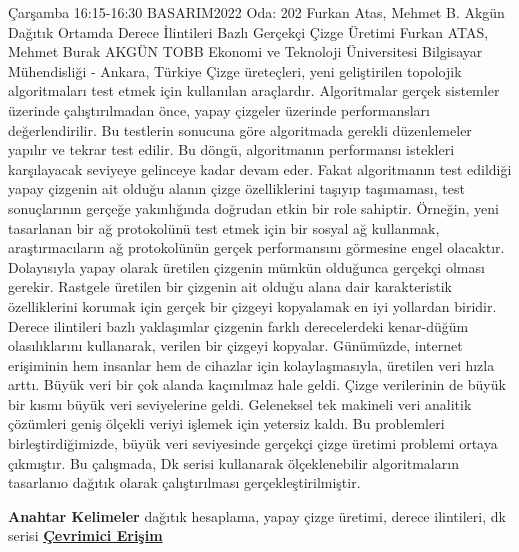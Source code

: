 
    \begin{abstract_basarim}
    {Çarşamba 16:15-16:30}
    {BASARIM2022}
    {Oda: 202}
    {Furkan Atas, Mehmet B. Akgün}
    {Dağıtık Ortamda Derece İlintileri Bazlı Gerçekçi Çizge Üretimi}
    {%
    Furkan ATAS, Mehmet Burak AKGÜN}
    {%
    }
    {%
    TOBB Ekonomi ve Teknoloji Üniversitesi Bilgisayar Mühendisliği - Ankara, Türkiye}
    Çizge üreteçleri, yeni geliştirilen topolojik algoritmaları test etmek için kullanılan araçlardır. Algoritmalar gerçek sistemler üzerinde çalıştırılmadan önce, yapay çizgeler üzerinde performansları değerlendirilir. Bu testlerin sonucuna göre algoritmada gerekli düzenlemeler yapılır ve tekrar test edilir. Bu döngü, algoritmanın performansı istekleri karşılayacak seviyeye gelinceye kadar devam eder. Fakat algoritmanın test edildiği yapay çizgenin ait olduğu alanın çizge özelliklerini taşıyıp taşımaması, test sonuçlarının gerçeğe yakınlığında doğrudan etkin bir role sahiptir. Örneğin, yeni tasarlanan bir ağ protokolünü test etmek için bir sosyal ağ kullanmak, araştırmacıların ağ protokolünün gerçek performansını görmesine engel olacaktır. Dolayısıyla yapay olarak üretilen çizgenin mümkün olduğunca gerçekçi olması gerekir. Rastgele üretilen bir çizgenin ait olduğu alana dair karakteristik özelliklerini korumak için gerçek bir çizgeyi kopyalamak en iyi yollardan biridir. Derece ilintileri bazlı yaklaşımlar çizgenin farklı derecelerdeki kenar-düğüm olasılıklarını kullanarak, verilen bir çizgeyi kopyalar. Günümüzde, internet erişiminin hem insanlar hem de cihazlar için kolaylaşmasıyla, üretilen veri hızla arttı. Büyük veri bir çok alanda kaçınılmaz hale geldi. Çizge verilerinin de büyük bir kısmı büyük veri seviyelerine geldi. Geleneksel tek makineli veri analitik çözümleri geniş ölçekli veriyi işlemek için yetersiz kaldı. Bu problemleri birleştirdiğimizde, büyük veri seviyesinde gerçekçi çizge üretimi problemi ortaya çıkmıştır. Bu çalışmada, Dk serisi kullanarak ölçeklenebilir algoritmaların tasarlanıo dağıtık olarak çalıştırılması gerçekleştirilmiştir. 
    
            \textbf{Anahtar Kelimeler} \newline{}dağıtık hesaplama, yapay çizge üretimi, derece ilintileri, dk serisi
     \newline\newline\noindent \href{https://drive.google.com/file/d/1IqKS_UXObPg5KbBPI44uvgCJgLN1w660/view?usp=drivesdk}{\bfseries Çevrimici Erişim}
    \end{abstract_basarim}
    